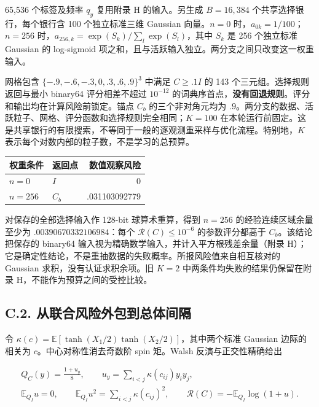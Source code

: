 \documentclass[11pt,a4paper]{article}
\begin{document}
65,536 个标签及频率 \(q_y\) 复用附录 H 的输入。另生成 \(B=16,384\)
个共享选择银行，每个银行含 100 个独立标准三维 Gaussian 向量。\(n=0\)
时，\(a_{0k}=1/100\)；\(n=256\)
时，\(a_{256,k}=\exp(S_k)/\sum_l\exp(S_l)\)，其中 \(S_k\) 是 256
个独立标准 Gaussian 的 log-sigmoid
项之和，且与活跃输入独立。两分支之间只改变这一权重输入。

网格包含 \(\{-.9,-.6,-.3,0,.3,.6,.9\}^3\) 中满足 \(C\ge.1I\) 的 143
个三元组。选择规则返回与最小 binary64 评分相差不超过 \(10^{-12}\)
的词典序首点，\textbf{没有回退规则}。评分和输出均在计算风险前锁定。锚点
\(C_b\) 的三个非对角元均为
\(.9\)。两分支的数据、活跃粒子、网格、评分函数和选择规则完全相同；\(K=100\)
在本轮运行前固定。这是共享银行的有限搜索，不等同于一般的逐观测重采样与优化流程。特别地，\(K\)
表示每个对数内部的粒子数，不是学习的总预算。

\begin{longtable}[]{@{}llr@{}}
\toprule\noalign{}
权重条件 & 返回点 & 数值观察风险 \\
\midrule\noalign{}
\endhead
\bottomrule\noalign{}
\endlastfoot
\(n=0\) & \(I\) & 0 \\
\(n=256\) & \(C_b\) & .031103092779 \\
\end{longtable}

对保存的全部选择输入作 128-bit 球算术重算，得到 \(n=256\)
的经验连续区域余量至少为 \(.00390670332106984\)：每个
\(\mathcal R(C)\le10^{-6}\) 的参数评分都高于 \(C_b\)。该结论把保存的
binary64 输入视为精确数学输入，并计入平方根残差余量（附录
H）；它是确定性结论，不是重抽数据的失败概率。所报风险值来自相互核对的
Gaussian 求积，没有认证求积余项。旧 \(K=2\)
中两条件均失败的结果仍保留在附录 H，不能作为预算之间的受控比较。

\subsection*{C.2.
从联合风险外包到总体间隔}\label{c.2.-ux4eceux8054ux5408ux98ceux9669ux5916ux5305ux5230ux603bux4f53ux95f4ux9694}

令 \(\kappa(c)=\mathbb E[\tanh(X_1/2)\tanh(X_2/2)]\)，其中两个标准
Gaussian 边际的相关为 \(c\)。中心对称性消去奇数阶 spin 矩。Walsh
反演与正交性精确给出

\[
\begin{gathered}
Q_C(y)=\frac{1+u_y}{8},\qquad u_y=\sum_{i<j}\kappa(c_{ij})y_iy_j,\\
\mathbb E_{Q_I}u=0,\qquad\mathbb E_{Q_I}u^2=\sum_{i<j}\kappa(c_{ij})^2,\qquad
\mathcal R(C)=-\mathbb E_{Q_I}\log(1+u).
\end{gathered}
\tag{C.2}
\]
\end{document}
